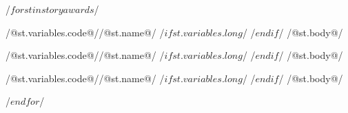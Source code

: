 \documentclass[landscape, 10pt]{article}
\begin{document}
\begin{multicols}{3}

/$ for st in storyawards $/ 
\begin{storyaward}{/@st.variables.code@/}{/@st.name@/}
/$ if st.variables.long $/ \small /$ endif $/
\indent /@st.body@/
\end{storyaward}
\columnbreak
\begin{storyaward}{/@st.variables.code@/}{/@st.name@/}
/$ if st.variables.long $/ \small /$ endif $/
\indent /@st.body@/
\end{storyaward}
\columnbreak
\begin{storyaward}{/@st.variables.code@/}{/@st.name@/}
/$ if st.variables.long $/ \small /$ endif $/
\indent /@st.body@/
\end{storyaward}
\pagebreak
/$ endfor $/
\end{multicols}
\end{document}
